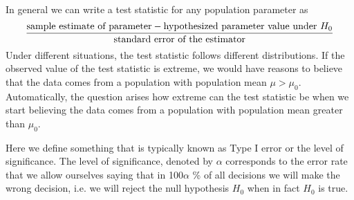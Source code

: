 \documentclass[12]{report}
\begin{document}
In general we can write a test statistic for any population parameter as 
$$\frac{\hbox{sample estimate of parameter} - \hbox{hypothesized parameter value under }H_0 }{\hbox{standard error of the estimator}}$$ 
Under different situations, the test statistic follows different distributions. If the observed value of the test statistic is extreme, we would have reasons to believe that the data comes from a population with population mean $\mu > \mu_0$. Automatically, the question arises how extreme can the test statistic be when we start believing the data comes from a population with population mean greater than $\mu_0$. 

 Here we define something that is typically known as Type I error or the level of significance. The level of significance, denoted by $\alpha$ corresponds to the error rate that we allow ourselves saying that in 100$\alpha$ \% of all decisions we will make the wrong decision, i.e. we will reject the null hypothesis $H_0$ when in fact $H_0$ is true. 
 
\end{document}
